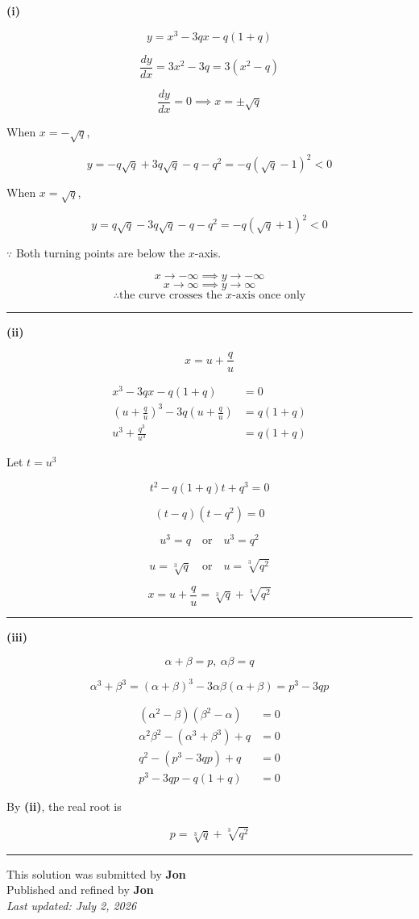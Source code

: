 \documentclass[12pt]{article}
\begin{document}
\newcommand{\ds}{\displaystyle}

\textbf{(i)}

$$y=x^3-3qx-q(1+q)$$

$$\frac{dy}{dx}=3x^2-3q=3(x^2-q)$$

$$\frac{dy}{dx}=0\implies x=\pm\sqrt q$$

When $\ds x=-\sqrt q$,

$$y=-q\sqrt q+3q\sqrt q-q-q^2=-q(\sqrt q-1)^2<0$$


When $\ds x=\sqrt q$,

$$y=q\sqrt q-3q\sqrt q-q-q^2=-q(\sqrt q+1)^2<0$$


$\because$ Both turning points are below the $x$-axis.

$$x\to-\infty\implies y\to-\infty$$
$$x\to\infty\implies y\to\infty$$
$$\therefore \text{the curve crosses the }x\text{-axis once only}$$

\bigskip\hrule\bigskip

\textbf{(ii)}

$$x=u+\frac qu$$


\begin{align*}
x^3-3qx-q(1+q)&=0\\
\left(u+\frac qu\right)^3-3q\left(u+\frac qu\right)&=q(1+q)\\
u^3+\frac{q^3}{u^3}&=q(1+q)
\end{align*}

Let $\ds t=u^3$

$$t^2-q(1+q)t+q^3=0$$

$$(t-q)(t-q^2)=0$$

$$u^3=q\quad \text{or}\quad u^3=q^2$$

$$u=\sqrt[3]{q}\quad \text{or}\quad u=\sqrt[3]{q^2}$$

$$x=u+\frac qu=\sqrt[3]{q}+\sqrt[3]{q^2}$$

\bigskip\hrule\bigskip

\textbf{(iii)}

$$\alpha+\beta=p,\  \alpha\beta=q$$

$$\alpha^3+\beta^3=(\alpha+\beta)^3-3\alpha\beta(\alpha+\beta)=p^3-3qp$$

\begin{align*}
(\alpha^2-\beta)(\beta^2-\alpha)&=0\\
\alpha^2\beta^2-(\alpha^3+\beta^3)+q&=0\\
q^2-(p^3-3qp)+q&=0\\
p^3-3qp-q(1+q)&=0
\end{align*}

By \textbf{(ii)}, the real root is

$$p=\sqrt[3]{q}+\sqrt[3]{q^2}$$

\bigskip
\hrule
\begin{center}
    This solution was submitted by \textbf{Jon}\\[4pt]
    Published and refined by \textbf{Jon}\\[8pt]
    \textit{Last updated: July 2, 2026}
\end{center}
\end{document}

